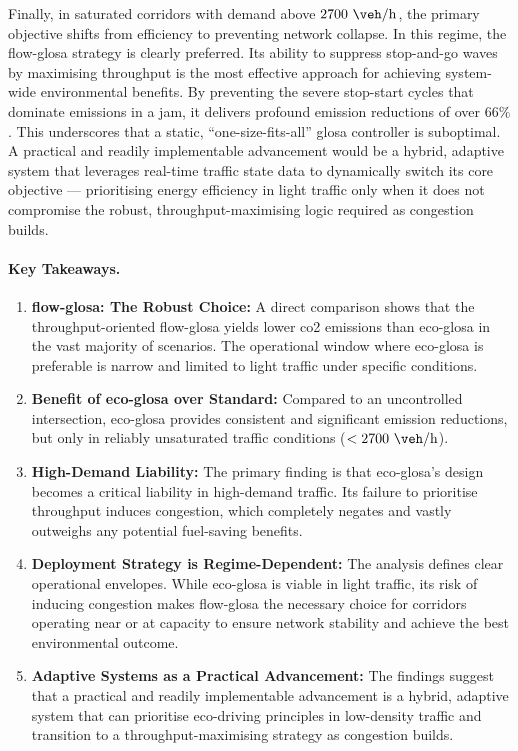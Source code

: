 \mynewline
Finally, in saturated corridors with demand above $2700~\unit{\veh\per\hour}$, the primary objective shifts from efficiency to preventing network collapse. In this regime, the \ac{flow-glosa} strategy is clearly preferred. Its ability to suppress stop-and-go waves by maximising throughput is the most effective approach for achieving system-wide environmental benefits. By preventing the severe stop-start cycles that dominate emissions in a jam, it delivers profound emission reductions of over $66\%$. This underscores that a static, \enquote{one-size-fits-all} \ac{glosa} controller is suboptimal. A practical and readily implementable advancement would be a hybrid, adaptive system that leverages real-time traffic state data to dynamically switch its core objective --- prioritising energy efficiency in light traffic only when it does not compromise the robust, throughput-maximising logic required as congestion builds.

\paragraph{Key Takeaways.}
\begin{enumerate}
    \item \textbf{\ac{flow-glosa}: The Robust Choice:} A direct comparison shows that the throughput-oriented \ac{flow-glosa} yields lower \ac{co2} emissions than \ac{eco-glosa} in the vast majority of scenarios. The operational window where \ac{eco-glosa} is preferable is narrow and limited to light traffic under specific conditions.
    \item \textbf{Benefit of \ac{eco-glosa} over Standard:} Compared to an uncontrolled intersection, \ac{eco-glosa} provides consistent and significant emission reductions, but only in reliably unsaturated traffic conditions ($< 2700~\unit{\veh\per\hour}$).
    \item \textbf{High-Demand Liability:} The primary finding is that \ac{eco-glosa}'s design becomes a critical liability in high-demand traffic. Its failure to prioritise throughput induces congestion, which completely negates and vastly outweighs any potential fuel-saving benefits.
    \item \textbf{Deployment Strategy is Regime-Dependent:} The analysis defines clear operational envelopes. While \ac{eco-glosa} is viable in light traffic, its risk of inducing congestion makes \ac{flow-glosa} the necessary choice for corridors operating near or at capacity to ensure network stability and achieve the best environmental outcome.
    \item \textbf{Adaptive Systems as a Practical Advancement:} The findings suggest that a practical and readily implementable advancement is a hybrid, adaptive system that can prioritise eco-driving principles in low-density traffic and transition to a throughput-maximising strategy as congestion builds.
\end{enumerate}

